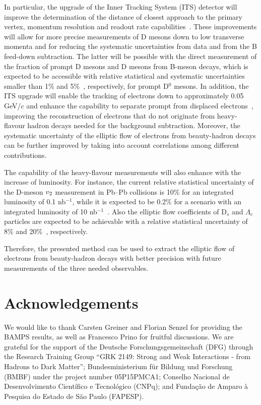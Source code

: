 \documentclass[11pt,a4paper]{article}
\providecommand{\vtwo}{$v_{\rm 2}$ }
\begin{document}
In particular, the upgrade of the Inner Tracking System (ITS) detector will improve the determination of the distance of closest approach to the primary vertex, momentum resolution and readout rate capabilities~\cite{0954-3899-41-8-087002}. These improvements will allow for more precise measurements of D mesons down to low transverse momenta and for reducing the systematic uncertainties  from data and from the B feed-down subtraction. 
The latter will be possible with the direct measurement of the fraction of prompt D mesons and D mesons from B-meson decays, which is expected to be accessible with relative statistical and systematic uncertainties smaller than 1\% and 5\%~\cite{0954-3899-41-8-087002}, respectively, for prompt D$^{0}$ mesons.
In addition, the ITS upgrade will enable the tracking of electrons down to approximately 0.05 GeV/$c$ and enhance the capability to separate prompt from displaced electrons~\cite{0954-3899-41-8-087002}, improving the reconstruction of electrons that do not originate from heavy-flavour hadron decays needed for the background subtraction. Moreover, the systematic uncertainty of the elliptic flow of electrons from beauty-hadron decays can be further improved by taking into account correlations among different contributions.

The capability of the heavy-flavour measurements will also enhance with the increase of luminosity. For instance, the current relative statistical uncertainty of the D-meson \vtwo measurement in Pb--Pb collisions is 10\% for an integrated luminosity of 0.1 nb$^{-1}$, while it is expected to be 0.2\% for a scenario with an integrated luminosity of 10 nb$^{-1}$~\cite{0954-3899-41-8-087002}. Also the elliptic flow coefficients of D$_{s}$ and $\Lambda_{c}$  particles are expected to be achievable with a relative statistical uncertainty of 8\% and 20\%~\cite{0954-3899-41-8-087002}, respectively. 

Therefore, the presented method can be used to extract the elliptic flow of electrons from beauty-hadron decays with better precision with future measurements of the three needed observables.


\section*{Acknowledgements}
We would like to thank Carsten Greiner and Florian Senzel for providing the BAMPS results, as well as Francesco Prino for fruitful discussions.
We are grateful for the support of the Deutsche Forschungsgemeinschaft (DFG)    through the Research Training Group ``GRK 2149: Strong and Weak Interactions - from Hadrons to Dark Matter''; Bundesministerium f\"ur Bildung und Forschung (BMBF) under the project number  05P15PMCA1; Conselho Nacional de Desenvolvimento Cient\'ifico e Tecnol\'ogico (CNPq); and Funda\c{c}\~ao de Amparo \`a Pesquisa do Estado de S\~ao Paulo (FAPESP).






\end{document}
